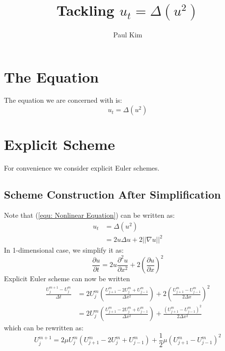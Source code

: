 \documentclass[a4paper]{article}
\title{Tackling $u_{t} = \Delta \left( u^2 \right)$}
\author{Paul Kim}
\begin{document}
\maketitle
\section{The Equation}
The equation we are concerned with is:
\begin{equation}
    u_{t} = \Delta \left( u^2 \right)
    \label{equ: Nonlinear Equation}
\end{equation}

\section{Explicit Scheme}
For convenience we consider explicit Euler schemes.

\subsection{Scheme Construction After Simplification}
Note that (\ref{equ: Nonlinear Equation}) can be written as:
\begin{align}
    u_t &= \Delta \left( u^2 \right) \\
    &= 2 u \Delta u + 2 || \nabla u ||^2
\end{align}
In 1-dimensional case, we simplify it as:
\begin{equation}
    \frac{\partial u}{\partial t} = 2 u \frac{\partial^2 u}{\partial x^2} + 2 \left( \frac{\partial u}{\partial x} \right)^2
\end{equation}
Explicit Euler scheme can now be written
\begin{align}
    \frac{U_j^{m+1} - U_j^m}{\Delta t}
    &= 2 U_j^m \left( \frac{U_{j+1}^m - 2 U_{j}^m + U_{j-1}^m}{\Delta x^2} \right)
    + 2 \left( \frac{U_{j+1}^m - U_{j-1}^m}{2 \Delta x} \right)^2 \\
    &= 2 U_j^m \left( \frac{U_{j+1}^m - 2 U_{j}^m + U_{j-1}^m}{\Delta x^2} \right)
    + \frac{\left( U_{j+1}^m - U_{j-1}^m \right)^2}{2 \Delta x^2}
\end{align}
which can be rewritten as:
\begin{equation}
    U_j^{m+1} = 2 \mu U_j^m \left( U_{j+1}^m - 2 U_{j}^m + U_{j-1}^m \right) 
    + \frac{1}{2} \mu \left( U_{j+1}^m - U_{j-1}^m \right)^2
\end{equation}
\end{document}
